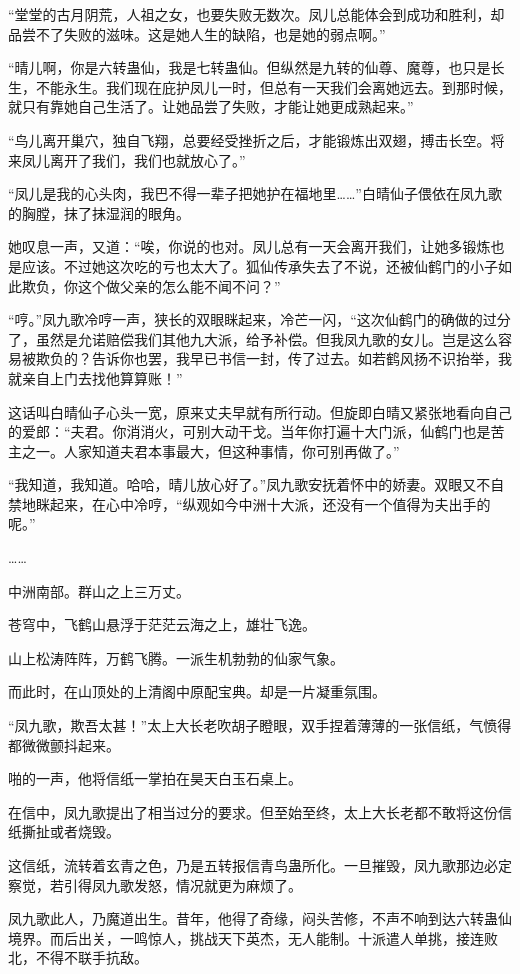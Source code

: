 \begin{this_body}
“堂堂的古月阴荒，人祖之女，也要失败无数次。凤儿总能体会到成功和胜利，却品尝不了失败的滋味。这是她人生的缺陷，也是她的弱点啊。”

“晴儿啊，你是六转蛊仙，我是七转蛊仙。但纵然是九转的仙尊、魔尊，也只是长生，不能永生。我们现在庇护凤儿一时，但总有一天我们会离她远去。到那时候，就只有靠她自己生活了。让她品尝了失败，才能让她更成熟起来。”

“鸟儿离开巢穴，独自飞翔，总要经受挫折之后，才能锻炼出双翅，搏击长空。将来凤儿离开了我们，我们也就放心了。”

“凤儿是我的心头肉，我巴不得一辈子把她护在福地里……”白晴仙子偎依在凤九歌的胸膛，抹了抹湿润的眼角。

她叹息一声，又道：“唉，你说的也对。凤儿总有一天会离开我们，让她多锻炼也是应该。不过她这次吃的亏也太大了。狐仙传承失去了不说，还被仙鹤门的小子如此欺负，你这个做父亲的怎么能不闻不问？”

“哼。”凤九歌冷哼一声，狭长的双眼眯起来，冷芒一闪，“这次仙鹤门的确做的过分了，虽然是允诺赔偿我们其他九大派，给予补偿。但我凤九歌的女儿。岂是这么容易被欺负的？告诉你也罢，我早已书信一封，传了过去。如若鹤风扬不识抬举，我就亲自上门去找他算算账！”

这话叫白晴仙子心头一宽，原来丈夫早就有所行动。但旋即白晴又紧张地看向自己的爱郎：“夫君。你消消火，可别大动干戈。当年你打遍十大门派，仙鹤门也是苦主之一。人家知道夫君本事最大，但这种事情，你可别再做了。”

“我知道，我知道。哈哈，晴儿放心好了。”凤九歌安抚着怀中的娇妻。双眼又不自禁地眯起来，在心中冷哼，“纵观如今中洲十大派，还没有一个值得为夫出手的呢。”

……

中洲南部。群山之上三万丈。

苍穹中，飞鹤山悬浮于茫茫云海之上，雄壮飞逸。

山上松涛阵阵，万鹤飞腾。一派生机勃勃的仙家气象。

而此时，在山顶处的上清阁中原配宝典。却是一片凝重氛围。

“凤九歌，欺吾太甚！”太上大长老吹胡子瞪眼，双手捏着薄薄的一张信纸，气愤得都微微颤抖起来。

啪的一声，他将信纸一掌拍在昊天白玉石桌上。

在信中，凤九歌提出了相当过分的要求。但至始至终，太上大长老都不敢将这份信纸撕扯或者烧毁。

这信纸，流转着玄青之色，乃是五转报信青鸟蛊所化。一旦摧毁，凤九歌那边必定察觉，若引得凤九歌发怒，情况就更为麻烦了。

凤九歌此人，乃魔道出生。昔年，他得了奇缘，闷头苦修，不声不响到达六转蛊仙境界。而后出关，一鸣惊人，挑战天下英杰，无人能制。十派遣人单挑，接连败北，不得不联手抗敌。


\end{this_body}

